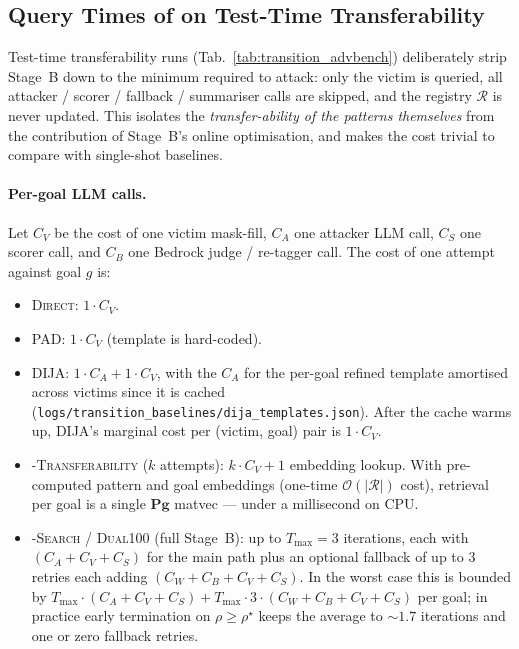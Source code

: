 \subsection{Query Times of \method on Test-Time Transferability}\label{appd:querycost}
Test-time transferability runs (Tab.~\ref{tab:transition_advbench}) deliberately
strip Stage~B down to the minimum required to attack: only the victim is
queried, all attacker / scorer / fallback / summariser calls are skipped, and
the registry $\mathcal{R}$ is never updated. This isolates the
\emph{transfer-ability of the patterns themselves} from the contribution of
Stage~B's online optimisation, and makes the cost trivial to compare with
single-shot baselines.

\paragraph{Per-goal LLM calls.}
Let $C_{V}$ be the cost of one victim mask-fill, $C_{A}$ one attacker LLM
call, $C_{S}$ one scorer call, and $C_{B}$ one Bedrock judge / re-tagger
call. The cost of one attempt against goal $g$ is:
\begin{itemize}
\item \textsc{Direct}: $1\cdot C_V$.
\item \textsc{PAD}: $1\cdot C_V$ (template is hard-coded).
\item \textsc{DIJA}: $1\cdot C_A + 1\cdot C_V$, with the $C_A$ for the
per-goal refined template amortised across victims since it is cached
(\texttt{logs/transition\_baselines/dija\_templates.json}). After the cache
warms up, DIJA's marginal cost per (victim, goal) pair is $1\cdot C_V$.
\item \textsc{\method-Transferability} ($k$ attempts): $k\cdot C_V + 1$
embedding lookup. With pre-computed pattern and goal embeddings (one-time
$\mathcal{O}(|\mathcal{R}|)$ cost), retrieval per goal is a single
$\mathbf{P} \mathbf{g}$ matvec --- under a millisecond on CPU.
\item \textsc{\method-Search / Dual100} (full Stage~B): up to $T_{\max}{=}3$
iterations, each with $(C_A + C_V + C_S)$ for the main path plus an
optional fallback of up to $3$ retries each adding $(C_W + C_B + C_V + C_S)$.
In the worst case this is bounded by
$T_{\max}\cdot(C_A + C_V + C_S) + T_{\max}\cdot 3\cdot(C_W + C_B + C_V + C_S)$
per goal; in practice early termination on $\rho \ge \rho^{\star}$ keeps the
average to $\sim\!1.7$ iterations and one or zero fallback retries.
\end{itemize}

